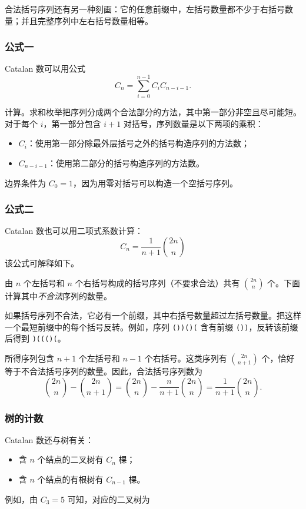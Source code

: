合法括号序列还有另一种刻画：它的任意前缀中，左括号数量都不少于右括号数量；并且完整序列中左右括号数量相等。

\subsubsection{公式一}

Catalan 数可以用公式
\[ C_n = \sum_{i=0}^{n-1} C_{i} C_{n-i-1}.\]

计算。求和枚举把序列分成两个合法部分的方法，其中第一部分非空且尽可能短。对于每个 $i$，第一部分包含 $i+1$ 对括号，序列数量是以下两项的乘积：

\begin{itemize}
\item $C_i$：使用第一部分除最外层括号之外的括号构造序列的方法数；
\item $C_{n-i-1}$：使用第二部分的括号构造序列的方法数。
\end{itemize}

边界条件为 $C_0=1$，因为用零对括号可以构造一个空括号序列。

\subsubsection{公式二}

Catalan 数也可以用二项式系数计算：
\[ C_n = \frac{1}{n+1} {2n \choose n}\]
该公式可解释如下。

由 $n$ 个左括号和 $n$ 个右括号构成的括号序列（不要求合法）共有 ${2n \choose n}$ 个。下面计算其中\emph{不合法}序列的数量。

如果括号序列不合法，它必有一个前缀，其中右括号数量超过左括号数量。把这样一个最短前缀中的每个括号反转。例如，序列 \texttt{())()(} 含有前缀 \texttt{())}，反转该前缀后得到 \texttt{)((()(}。

所得序列包含 $n+1$ 个左括号和 $n-1$ 个右括号。这类序列有 ${2n \choose n+1}$ 个，恰好等于不合法括号序列的数量。因此，合法括号序列数为
\[{2n \choose n}-{2n \choose n+1} = {2n \choose n} - \frac{n}{n+1} {2n \choose n} = \frac{1}{n+1} {2n \choose n}.\]

\subsubsection{树的计数}

Catalan 数还与树有关：

\begin{itemize}
\item 含 $n$ 个结点的二叉树有 $C_n$ 棵；
\item 含 $n$ 个结点的有根树有 $C_{n-1}$ 棵。
\end{itemize}
\noindent
例如，由 $C_3=5$ 可知，对应的二叉树为

